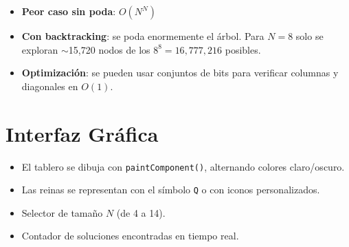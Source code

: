 \documentclass[12pt,a4paper]{article}
\begin{document}
\begin{itemize}
  \item \textbf{Peor caso sin poda}: $O(N^N)$
  \item \textbf{Con backtracking}: se poda enormemente el árbol. Para $N=8$ solo se exploran $\sim$15,720 nodos de los $8^8 = 16{,}777{,}216$ posibles.
  \item \textbf{Optimización}: se pueden usar conjuntos de bits para verificar columnas y diagonales en $O(1)$.
\end{itemize}

\section{Interfaz Gráfica}

\begin{itemize}
  \item El tablero se dibuja con \texttt{paintComponent()}, alternando colores claro/oscuro.
  \item Las reinas se representan con el símbolo \texttt{Q} o con iconos personalizados.
  \item Selector de tamaño $N$ (de 4 a 14).
  \item Contador de soluciones encontradas en tiempo real.
\end{itemize}
\end{document}
